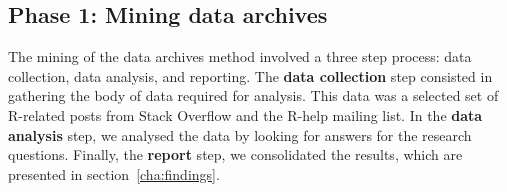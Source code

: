 %
%
%


\subsection{Phase 1: Mining data archives} 
\label{sec:studyDesign}

	The mining of the data archives method involved a three step process: data collection, data analysis, and reporting.%
	The \textbf{data collection} step consisted in gathering the body of data required for analysis.
	This data was a selected set of R-related posts from Stack Overflow and the R-help mailing list.
	In the \textbf{data analysis} step, we analysed the data by looking for answers for the research questions.
	Finally, the \textbf{report} step, we consolidated the results, which are presented in section~\ref{cha:findings}.

